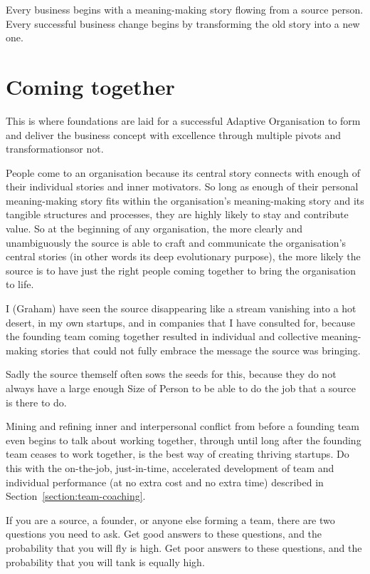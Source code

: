 Every business begins with a meaning\hyp{}making story flowing from a source person. Every successful business change begins by transforming the old story into a new one.


\section{Coming together}
\label{section:coming-together}
This is where foundations are laid for a successful Adaptive Organisation  to form and deliver the business concept with excellence through multiple pivots and transformations\textemdash or not. 


People come to an organisation because its central story connects with enough of their individual stories and inner motivators. So long as enough of their personal meaning\hyp{}making story fits within the organisation's meaning\hyp{}making story and its tangible structures and processes, they are highly likely to stay and contribute value. So at the beginning of any organisation, the more clearly and unambiguously the source is able to craft and communicate the organisation’s central stories (in other words its deep evolutionary purpose), the more likely the source is to have just the right people coming together to bring the organisation to life.


I (Graham) have seen the source disappearing like a stream vanishing into a hot desert, in my own startups, and in companies that I have consulted for, because the founding team coming together resulted in individual and collective meaning\hyp{}making stories that could not fully embrace the message the source was bringing.


Sadly the source themself often sows the seeds for this, because they do not always have a large enough Size of Person  to be able to do the job that a source is there to do. 


Mining and refining inner and interpersonal conflict from before a founding team even begins to talk about working together, through until long after the founding team ceases to work together, is the best way of creating thriving startups. Do this with the on-the-job, just-in-time, accelerated development of team and individual performance (at no extra cost and no extra time) described in Section~\ref{section:team-coaching}.


If you are a source, a founder, or anyone else forming a team, there are two questions you need to ask. Get good answers to these questions, and the probability that you will fly is high. Get poor answers to these questions, and the probability that you will tank is equally high. 


